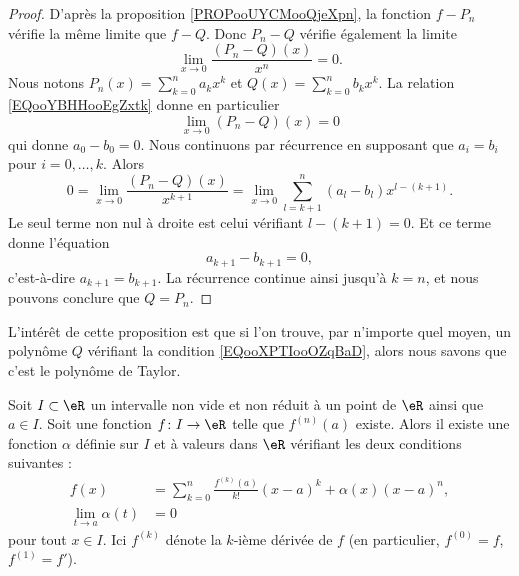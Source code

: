 \begin{proof}
	D'après la proposition \ref{PROPooUYCMooQjeXpn}, la fonction \( f-P_n\) vérifie la même limite que \( f-Q\). Donc \( P_n-Q\) vérifie également la limite
	\begin{equation}        \label{EQooYBHHooEgZxtk}
		\lim_{x\to 0} \frac{ (P_n-Q)(x) }{ x^n }=0.
	\end{equation}
	Nous notons \( P_n(x)=\sum_{k=0}^na_kx^k\) et \( Q(x)=\sum_{k=0}^nb_kx^k\). La relation \eqref{EQooYBHHooEgZxtk} donne en particulier
	\begin{equation}
		\lim_{x\to 0} (P_n-Q)(x)=0
	\end{equation}
	qui donne \( a_0-b_0=0\). Nous continuons par récurrence en supposant que \( a_i=b_i\) pour \( i=0,\ldots, k\). Alors
	\begin{equation}
		0=\lim_{x\to 0} \frac{ (P_n-Q)(x) }{ x^{k+1} }=\lim_{x\to 0} \sum_{l=k+1}^n(a_l-b_l)x^{l-(k+1)}.
	\end{equation}
	Le seul terme non nul à droite est celui vérifiant \( l-(k+1)=0\). Et ce terme donne l'équation
	\begin{equation}
		a_{k+1}-b_{k+1}=0,
	\end{equation}
	c'est-à-dire \( a_{k+1}=b_{k+1}\). La récurrence continue ainsi jusqu'à \( k=n\), et nous pouvons conclure que \( Q=P_n\).
\end{proof}
L'intérêt de cette proposition est que si l'on trouve, par n'importe quel moyen, un polynôme \( Q\) vérifiant la condition \eqref{EQooXPTIooOZqBaD}, alors nous savons que c'est le polynôme de Taylor.

\begin{theorem}		\label{ThoTaylor}
	Soit \( I\subset\eR\) un intervalle non vide et non réduit à un point de \( \eR\) ainsi que \( a\in I\). Soit une fonction \( f\colon I\to \eR\) telle que \( f^{(n)}(a)\) existe. Alors il existe une fonction \( \alpha\) définie sur \( I\) et à valeurs dans \( \eR\) vérifiant les deux conditions suivantes :
	\begin{subequations}		\label{SubEqsDevTauil}
		\begin{align}
			f(x)                   & = \sum_{k=0}^n\frac{ f^{(k)}(a) }{ k! }(x-a)^k +\alpha(x)(x-a)^{n}, 	\label{subeqfTepseqb} \\
			\lim_{t\to a}\alpha(t) & =0
		\end{align}
	\end{subequations}
	pour tout \( x\in I\). Ici \( f^{(k)}\) dénote la \( k\)-ième dérivée de \( f\) (en particulier, \( f^{(0)}=f\), \( f^{(1)}=f'\)).
\end{theorem}

